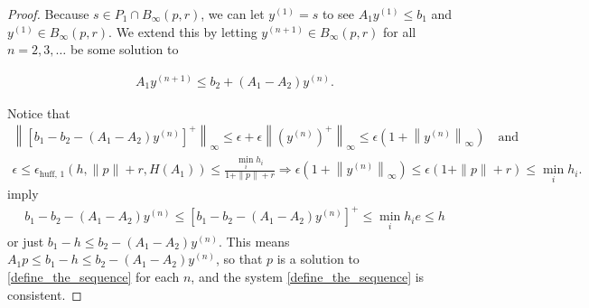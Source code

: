 \documentclass{article}
\theoremstyle{case}
\numberwithin{theorem}{subsection}
\newcommand{\ehuffo}{{\epsilon_{\textrm{huff, 1}}}}
\newcommand{\bpr}{{B_{\infty}\left(p, r\right)}}
\begin{document}
\begin{proof}

Because $s \in P_1 \cap \bpr$, we can let $y^{(1)} = s$ to see $A_1y^{(1)} \le b_1$ and $y^{(1)} \in \bpr$.
We extend this by letting $y^{(n+1)} \in \bpr$ for all $n = 2, 3, \ldots$ be some solution to

\begin{align}
A_1 y^{(n+1)} \le b_2 + (A_1 - A_2) y^{(n)}. \label{define_the_sequence}
\end{align}

Notice that
\begin{align*}
\left\|\left[b_1 - b_2 - (A_1 - A_2)y^{(n)}\right]^+\right\|_{\infty} 
\le \epsilon + \epsilon\left\| \left(y^{(n)}\right)^+\right\|_{\infty} 
\le \epsilon\left(1 + \left\|y^{(n)}\right\|_\infty\right) \quad \textrm{and} \\
\epsilon \le \ehuffo\left(h, \|p\| + r, H\left(A_1\right)\right) \le \frac{\min_i h_i}{1 + \|p\| + r} \Longrightarrow
\epsilon\left(1 + \left\|y^{(n)}\right\|_\infty\right) \le \epsilon\left(1 + \|p\| + r\right) \le \min_i h_i.
\end{align*}
imply
\begin{align*}
b_1 - b_2 - (A_1 - A_2)y^{(n)} \le \left[b_1 - b_2 - (A_1 - A_2)y^{(n)}\right]^+ \le \min_i h_i e \le h
\end{align*}
or just $b_1 - h \le b_2 - \left(A_1 - A_2\right)y^{(n)}$.
This means $A_1 p \le b_1 - h \le b_2 - \left(A_1 - A_2\right)y^{(n)}$,
so that $p$ is a solution to \cref{define_the_sequence} for each $n$, and the system \cref{define_the_sequence} is consistent.






\end{proof}
\end{document}
